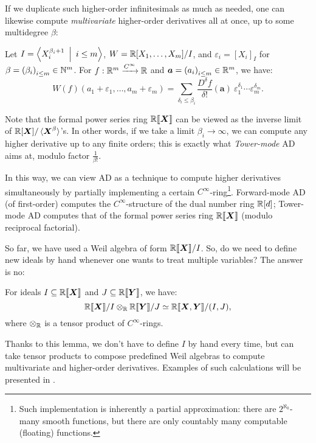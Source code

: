 If we duplicate such higher-order infinitesimals as much as needed, one can likewise compute \emph{multivariate} higher-order derivatives all at once, up to some multidegree $\beta$:
\begin{lemma}
  Let $I = \Braket{X_i^{\beta_i + 1}\ |\ i \leq m}$, $W = \mathbb{R}[X_1, \dots, X_m]/I$, and $\varepsilon_i = {[X_i]}_I$ for $\beta = {(\beta_i)}_{i \leq m} \in \mathbb{N}^m$.
  For $f: \mathbb{R}^m \xrightarrow{C^\infty} \mathbb{R}$ and $\boldsymbol{a} = {(a_i)}_{i \leq m} \in \mathbb{R}^m$, we have:
  \[
    W(f)(a_1 + \varepsilon_1, \dots, a_m + \varepsilon_m) =
      \sum_{\delta_i \leq \beta_i} 
      \frac{D^\delta f}{\delta !}(\boldsymbol{a})\ \varepsilon_1^{\delta_1} \cdots \varepsilon_m^{\delta_m}.
  \]
\end{lemma}

Note that the formal power series ring $\mathord{\mathbb{R}\llbracket\boldsymbol{X}\rrbracket}$ can be viewed as the inverse limit of $\mathbb{R}[\boldsymbol{X}]/\braket{\boldsymbol{X}^\beta}$'s.
In other words, if we take a limit $\beta_i \to \infty$, we can compute any higher derivative up to any finite orders; this is exactly what \emph{Tower-mode} AD aims at, modulo factor $\frac{1}{\beta!}$.

In this way, we can view AD as a technique to compute higher derivatives simultaneously by partially implementing a certain $C^\infty$-ring\footnote{Such implementation is inherently a partial approximation: there are $2^{\aleph_0}$-many smooth functions, but there are only countably many computable (floating) functions.}.
Forward-mode AD (of first-order) computes the $C^\infty$-structure of the dual number ring $\mathbb{R}[d]$; Tower-mode AD computes that of the formal power series ring $\mathord{\mathbb{R}\llbracket\boldsymbol{X}\rrbracket}$ (modulo reciprocal factorial).

So far, we have used a Weil algebra of form $\mathord{\mathbb{R}\llbracket\boldsymbol{X}\rrbracket}/I$.
So, do we need to define new ideals by hand whenever one wants to treat multiple variables?
The answer is no:

\begin{lemma}
  \label{thm:quot-tensor}
  For ideals $I \subseteq \mathbb{R}\llbracket\boldsymbol{X}\rrbracket$ and $J \subseteq \mathbb{R}\llbracket{}\boldsymbol{Y}\rrbracket$, we have:
  \[
    \mathord{\mathbb{R}\llbracket\boldsymbol{X}\rrbracket}/I \otimes_{\mathbb{R}} \mathbb{R}\llbracket{}\boldsymbol{Y}\rrbracket/J \simeq
    \mathbb{R}\llbracket{}\boldsymbol{X}, \boldsymbol{Y}\rrbracket/(I, J),
  \]
  where $\otimes_{\mathbb{R}}$ is a tensor product of $C^\infty$-rings.
\end{lemma}
Thanks to this lemma, we don't have to define $I$ by hand every time, but can take tensor products to compose predefined Weil algebras to compute multivariate and higher-order derivatives.
Examples of such calculations will be presented in .

